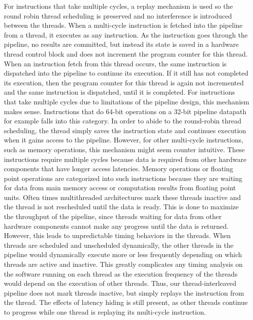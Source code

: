For instructions that take multiple cycles, a replay mechanism is used so the round robin thread scheduling is preserved and no interference is introduced between the threads.
When a multi-cycle instruction is fetched into the pipeline from a thread, it executes as any instruction.
As the instruction goes through the pipeline, no results are committed, but instead its state is saved in a hardware thread control block and does not increment the program counter for this thread. 
When an instruction fetch from this thread occurs, the same instruction is dispatched into the pipeline to continue its execution. 
If it still has not completed its execution, then the program counter for this thread is again not incremented and the same instruction is dispatched, until it is completed. 
For instructions that take multiple cycles due to limitations of the pipeline design, this mechanism makes sense.
Instructions that do 64-bit operations on a 32-bit pipeline datapath for example falls into this category. 
In order to abide to the round-robin thread scheduling, the thread simply saves the instruction state and continues execution when it gains access to the pipeline. 
However, for other multi-cycle instructions, such as memory operations, this mechanism might seem counter intuitive. 
These instructions require multiple cycles because data is required from other hardware components that have longer access latencies.
Memory operations or floating point operations are categorized into such instructions because they are waiting for data from main memory access or computation results from floating point units.
Often times multithreaded architectures mark these threads inactive and the thread is not rescheduled until the data is ready.
This is done to maximize the throughput of the pipeline, since threads waiting for data from other hardware components cannot make any progress until the data is returned. 
However, this leads to unpredictable timing behaviors in the threads.
When threads are scheduled and unscheduled dynamically, the other threads in the pipeline would dynamically execute more or less frequently depending on which threads are active and inactive.
This greatly complicates any timing analysis on the software running on each thread as the execution frequency of the threads would depend on the execution of other threads.
Thus, our thread-interleaved pipeline does not mark threads inactive, but simply replays the instruction from the thread.
The effects of latency hiding is still present, as other threads continue to progress while one thread is replaying its multi-cycle instruction.  


